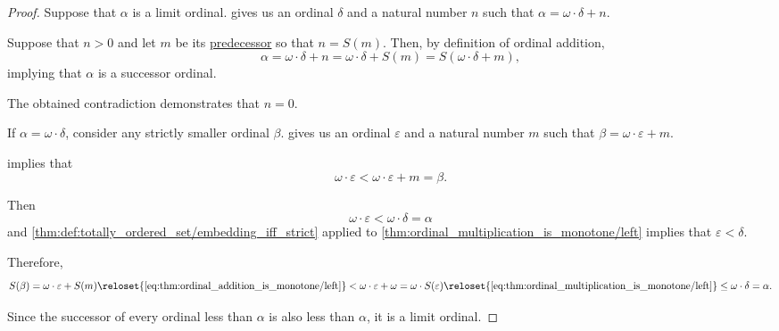 \begin{proof}
  \SufficiencySubProof Suppose that \( \alpha \) is a limit ordinal.  gives us an ordinal \( \delta \) and a natural number \( n \) such that \( \alpha = \omega \cdot \delta + n \).

  Suppose that \( n > 0 \) and let \( m \) be its \hyperref[thm:peano_arithmetic_predecessor_existence]{predecessor} so that \( n = S(m) \). Then, by definition of ordinal addition,
  \begin{equation*}
    \alpha
    =
    \omega \cdot \delta + n
    =
    \omega \cdot \delta + S(m)
    =
    S(\omega \cdot \delta + m),
  \end{equation*}
  implying that \( \alpha \) is a successor ordinal.

  The obtained contradiction demonstrates that \( n = 0 \).

  \NecessitySubProof If \( \alpha = \omega \cdot \delta \), consider any strictly smaller ordinal \( \beta \).  gives us an ordinal \( \varepsilon \) and a natural number \( m \) such that \( \beta = \omega \cdot \varepsilon + m \).

   implies that
  \begin{equation*}
    \omega \cdot \varepsilon < \omega \cdot \varepsilon + m = \beta.
  \end{equation*}

  Then
  \begin{equation*}
    \omega \cdot \varepsilon < \omega \cdot \delta = \alpha
  \end{equation*}
  and \cref{thm:def:totally_ordered_set/embedding_iff_strict} applied to \cref{thm:ordinal_multiplication_is_monotone/left} implies that \( \varepsilon < \delta \).

  Therefore,
  \begin{equation*}
    S(\beta)
    =
    \omega \cdot \varepsilon + S(m)
    \reloset {\eqref{eq:thm:ordinal_addition_is_monotone/left}} <
    \omega \cdot \varepsilon + \omega
    =
    \omega \cdot S(\varepsilon)
    \reloset {\eqref{eq:thm:ordinal_multiplication_is_monotone/left}} \leq
    \omega \cdot \delta
    =
    \alpha.
  \end{equation*}

  Since the successor of every ordinal less than \( \alpha \) is also less than \( \alpha \), it is a limit ordinal.
\end{proof}

